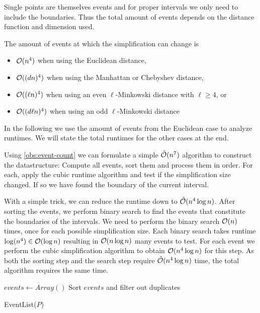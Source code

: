 Single points are themselves events and for proper intervals we only need to include the boundaries. Thus the total amount of events depends on the distance function and dimension used. 

\begin{observation}\label{obs:event-count}
	The amount of events at which the simplification can change is 
	\begin{itemize}
		\item \(\mathcal{O}(n^4)\) when using the Euclidean distance, 
		\item \(\mathcal{O}((dn)^4)\) when using the Manhattan or Chebyshev distance,
		\item \(\mathcal{O}((\ell n)^4)\) when using an even \(\ell\)-Minkowski distance with \(\ell \geq 4\), or 
		\item \(\mathcal{O}((d \ell n)^4)\) when using an odd \(\ell\)-Minkowski distance
	\end{itemize}
\end{observation}

In the following we use the amount of events from the Euclidean case to analyze runtimes. We will state the total runtimes for the other cases at the end. 

Using \cref{obs:event-count} we can formulate a simple \(\hat{\mathcal{O}}(n^7)\) algorithm to construct the datastructure: Compute all events, sort them and process them in order. For each, apply the cubic runtime algorithm and test if the simplification size changed. If so we have found the boundary of the current interval.

With a simple trick, we can reduce the runtime down to \(\hat{\mathcal{O}}(n^4 \log n)\). After sorting the events, we perform binary search to find the events that constitute the boundaries of the intervals. We need to perform the binary search \(\mathcal{O}(n)\) times, once for each possible simplification size. Each binary search takes runtime \(\log(n^4) \in \mathcal{O}(\log n)\) resulting in \(\mathcal{O}(n \log n)\) many events to test. For each event we perform the cubic simplification algorithm to obtain \(\mathcal{O}(n^4 \log n)\) for this step. As both the sorting step and the search step require \(\hat{\mathcal{O}}(n^4\log n)\) time, the total algorithm requires the same time. 

\begin{algorithm}[ht]
  \DontPrintSemicolon
  \BlankLine
	\(events \gets Array()\) 
	Sort \(events\) and filter out duplicates\;
  \caption{EventList(\(P\))}
  \label{algo:event-list}
\end{algorithm}

